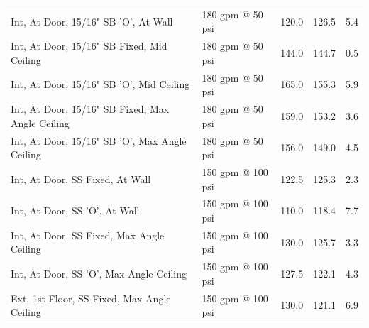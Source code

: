 \documentclass{book}
\begin{document}
\begin{table}[]
\begin{tabular}{lllll}
Int, At Door, 15/16" SB 'O', At Wall                  & 180 gpm @ 50 psi                    & 120.0                                  & 126.5                                   & 5.4                                     \\
Int, At Door, 15/16" SB Fixed, Mid Ceiling            & 180 gpm @ 50 psi                    & 144.0                                  & 144.7                                   & 0.5                                     \\
Int, At Door, 15/16" SB 'O', Mid Ceiling              & 180 gpm @ 50 psi                    & 165.0                                  & 155.3                                   & 5.9                                     \\
Int, At Door, 15/16" SB Fixed, Max Angle Ceiling      & 180 gpm @ 50 psi                    & 159.0                                  & 153.2                                   & 3.6                                     \\
Int, At Door, 15/16" SB 'O', Max Angle Ceiling        & 180 gpm @ 50 psi                    & 156.0                                  & 149.0                                   & 4.5                                     \\
Int, At Door, SS Fixed, At Wall                       & 150 gpm @ 100 psi                   & 122.5                                  & 125.3                                   & 2.3                                     \\
Int, At Door, SS 'O', At Wall                         & 150 gpm @ 100 psi                   & 110.0                                  & 118.4                                   & 7.7                                     \\
Int, At Door, SS Fixed, Max Angle Ceiling             & 150 gpm @ 100 psi                   & 130.0                                  & 125.7                                   & 3.3                                     \\
Int, At Door, SS 'O', Max Angle Ceiling               & 150 gpm @ 100 psi                   & 127.5                                  & 122.1                                   & 4.3                                     \\
Ext, 1st Floor, SS Fixed, Max Angle Ceiling           & 150 gpm @ 100 psi                   & 130.0                                  & 121.1                                   & 6.9                                     \\

\end{tabular}
\end{table}
\end{document}
